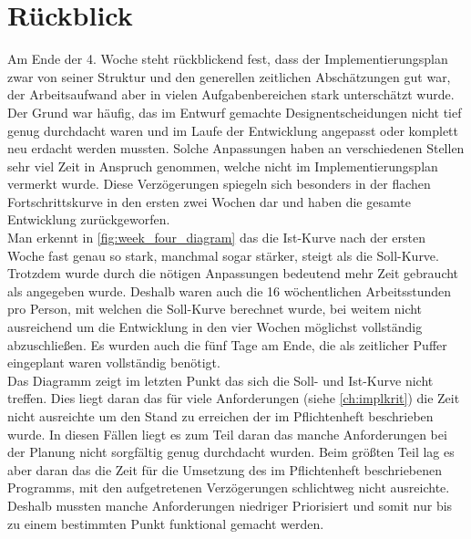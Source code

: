 \section{Rückblick}
Am Ende der 4. Woche steht rückblickend fest, dass der Implementierungsplan zwar von seiner Struktur und den generellen zeitlichen Abschätzungen gut war, der Arbeitsaufwand aber in vielen Aufgabenbereichen stark unterschätzt wurde. Der Grund war häufig, das im Entwurf gemachte Designentscheidungen nicht tief genug durchdacht waren und im Laufe der Entwicklung angepasst oder komplett neu erdacht werden mussten. Solche Anpassungen haben an verschiedenen Stellen sehr viel Zeit in Anspruch genommen, welche nicht im Implementierungsplan vermerkt wurde. Diese Verzögerungen spiegeln sich besonders in der flachen Fortschrittskurve in den ersten zwei Wochen dar und haben die gesamte Entwicklung zurückgeworfen. \\
Man erkennt in \ref{fig:week_four_diagram} das die Ist-Kurve nach der ersten Woche fast genau so stark, manchmal sogar stärker, steigt als die Soll-Kurve. Trotzdem wurde durch die nötigen Anpassungen bedeutend mehr Zeit gebraucht als angegeben wurde. Deshalb waren auch die 16 wöchentlichen Arbeitsstunden pro Person, mit welchen die Soll-Kurve berechnet wurde, bei weitem nicht ausreichend um die Entwicklung in den vier Wochen möglichst vollständig abzuschließen. Es wurden auch die fünf Tage am Ende, die als zeitlicher Puffer eingeplant waren vollständig benötigt. \\
Das Diagramm zeigt im letzten Punkt das sich die Soll- und Ist-Kurve nicht treffen. Dies liegt daran das für viele Anforderungen (siehe \ref{ch:implkrit}) die Zeit nicht ausreichte um den Stand zu erreichen der im Pflichtenheft beschrieben wurde. In diesen Fällen liegt es zum Teil daran das manche Anforderungen bei der Planung nicht sorgfältig genug durchdacht wurden. Beim größten Teil lag es aber daran das die Zeit für die Umsetzung des im Pflichtenheft beschriebenen Programms, mit den aufgetretenen Verzögerungen schlichtweg nicht ausreichte. Deshalb mussten manche Anforderungen niedriger Priorisiert und somit nur bis zu einem bestimmten Punkt funktional gemacht werden.